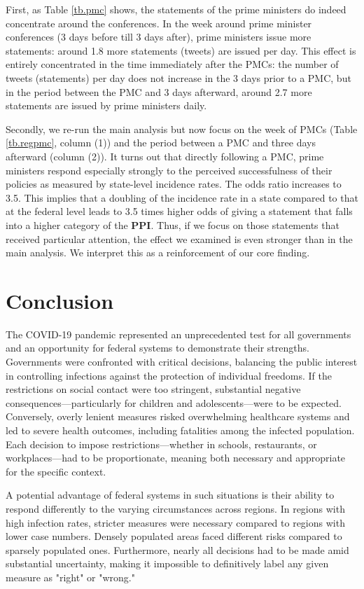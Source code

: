 \documentclass[authoryear,12pt, 3p]{elsarticle}
\theoremstyle{break}
\begin{document}
First, as Table \ref{tb.pmc} shows, the statements of the prime ministers do indeed concentrate around the conferences. In the week around prime minister conferences (3 days before till 3 days after), prime ministers issue more statements: around 1.8 more statements (tweets) are issued per day. This effect is entirely concentrated in the time immediately after the PMCs: the number of tweets (statements) per day does not increase in the 3 days prior to a PMC, but in the period between the PMC and 3 days afterward, around 2.7 more statements are issued by prime ministers daily.



Secondly, we re-run the main analysis but now focus on the week of PMCs (Table \ref{tb.regpmc}, column (1)) and the period between a PMC and three days afterward (column (2)). It turns out that directly following a PMC, prime ministers respond especially strongly to the perceived successfulness of their policies as measured by state-level incidence rates. The odds ratio increases to 3.5. This implies that a doubling of the incidence rate in a state compared to that at the federal level leads to 3.5 times higher odds of giving a statement that falls into a higher category of the \textbf{PPI}. Thus, if we focus on those statements that received particular attention, the effect we examined is even stronger than in the main analysis. We interpret this as a reinforcement of our core finding.

\section{Conclusion}\label{sec.conclusion}
The COVID-19 pandemic represented an unprecedented test for all governments and an opportunity for federal systems to demonstrate their strengths. Governments were confronted with critical decisions, balancing the public interest in controlling infections against the protection of individual freedoms. If the restrictions on social contact were too stringent, substantial negative consequences---particularly for children and adolescents---were to be expected. Conversely, overly lenient measures risked overwhelming healthcare systems and led to severe health outcomes, including fatalities among the infected population. Each decision to impose restrictions—whether in schools, restaurants, or workplaces—had to be proportionate, meaning both necessary and appropriate for the specific context.

A potential advantage of federal systems in such situations is their ability to respond differently to the varying circumstances across regions. In regions with high infection rates, stricter measures were necessary compared to regions with lower case numbers. Densely populated areas faced different risks compared to sparsely populated ones. Furthermore, nearly all decisions had to be made amid substantial uncertainty, making it impossible to definitively label any given measure as "right" or "wrong."
\end{document}
